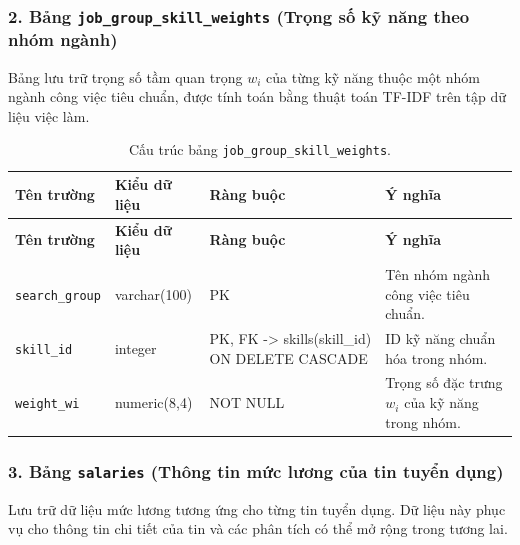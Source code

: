 \subsubsection*{2. Bảng \texttt{job\_\allowbreak group\_\allowbreak skill\_\allowbreak weights} (Trọng số kỹ năng theo nhóm ngành)}

Bảng lưu trữ trọng số tầm quan trọng $w_i$ của từng kỹ năng thuộc một nhóm ngành công việc tiêu chuẩn, được tính toán bằng thuật toán TF-IDF trên tập dữ liệu việc làm.

\begin{footnotesize}\begin{longtable}{|L{3.5cm}|L{2.0cm}|L{3.0cm}|L{5.5cm}|}
\caption{Cấu trúc bảng \texttt{job\_\allowbreak group\_\allowbreak skill\_\allowbreak weights}.}
\label{tab:skill_weights} \\
\hline
\textbf{Tên trường} & \textbf{Kiểu dữ liệu} & \textbf{Ràng buộc} & \textbf{Ý nghĩa} \\
\hline
\endfirsthead
\hline
\textbf{Tên trường} & \textbf{Kiểu dữ liệu} & \textbf{Ràng buộc} & \textbf{Ý nghĩa} \\
\hline
\endhead
\texttt{search\_\allowbreak group} & varchar(100) & PK & Tên nhóm ngành công việc tiêu chuẩn. \\
\texttt{skill\_id} & integer & PK, FK -> skills(skill\_id) ON DELETE CASCADE & ID kỹ năng chuẩn hóa trong nhóm. \\
\hline
\texttt{weight\_wi} & numeric(8,4) & NOT NULL & Trọng số đặc trưng $w_i$ của kỹ năng trong nhóm. \\
\hline
\end{longtable}
\end{footnotesize}

\subsubsection*{3. Bảng \texttt{salaries} (Thông tin mức lương của tin tuyển dụng)}

Lưu trữ dữ liệu mức lương tương ứng cho từng tin tuyển dụng. Dữ liệu này phục vụ cho thông tin chi tiết của tin và các phân tích có thể mở rộng trong tương lai.

